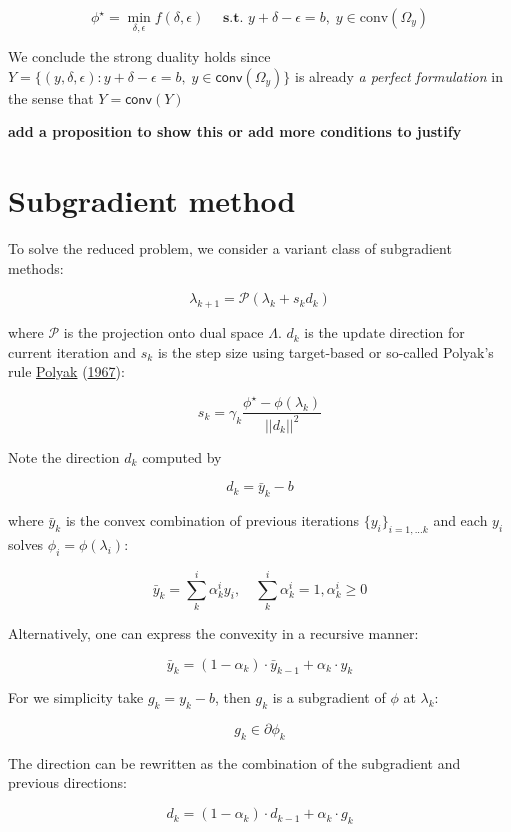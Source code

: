 \documentclass[
  a4paper,
,tablecaptionabove
]{scrartcl}
\numberwithin{equation}{section}
\begin{document}
\[ \phi^\star = \min_{\delta, \epsilon} f(\delta, \epsilon)\quad \textbf{ s.t. }  y + \delta - \epsilon = b,\; y \in \textrm{conv}(\Omega_y)\]

We conclude the strong duality holds since
\(Y = \{(y, \delta, \epsilon): y + \delta - \epsilon = b,\; y \in \textsf{conv}(\Omega_y)\}\)
is already \emph{a perfect formulation} in the sense that
\(Y = \textsf{conv}(Y)\)

\textbf{add a proposition to show this or add more conditions to
  justify}

\hypertarget{subgradient-method}{%
  \section{Subgradient method}\label{subgradient-method}}

To solve the reduced problem, we consider a variant class of subgradient
methods:

\[\lambda_{k+1} = \mathcal{P}(\lambda_{k} + s_{k}d_{k})\]

where \(\mathcal P\) is the projection onto dual space \(\Lambda\).
\(d_k\) is the update direction for current iteration and \(s_{k}\) is
the step size using target-based or so-called Polyak's rule
\protect\hyperlink{ref-polyak_general_1967}{Polyak}
(\protect\hyperlink{ref-polyak_general_1967}{1967}):

\[s_{k} = \gamma_k\frac{\phi^\star - \phi(\lambda_k)}{||d_{k}||^2}\]

Note the direction \(d_k\) computed by

\[d_k = \bar y_k - b\]

where \(\bar y_k\) is the convex combination of previous iterations
\(\{y_i\}_{i=1,...k}\) and each \(y_i\) solves
\(\phi_i = \phi(\lambda_i)\):

\[\bar y_k = \sum^i_k \alpha^i_k y_i,\quad  \sum^i_k \alpha^i_k = 1, \alpha^i_k \ge 0\]

Alternatively, one can express the convexity in a recursive manner:

\[\bar y_k = (1-\alpha_k)\cdot\bar y_{k-1} + \alpha_k \cdot y_k \]

For we simplicity take \(g_k= y_k - b\), then \(g_k\) is a subgradient
of \(\phi\) at \(\lambda_k\):

\[g_k \in \partial \phi_k\]

The direction can be rewritten as the combination of the subgradient and
previous directions:

\[d_k = (1-\alpha_k) \cdot d_{k-1} + \alpha_k\cdot g_k\]
\end{document}
